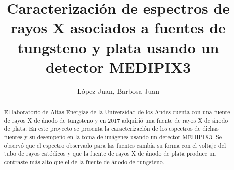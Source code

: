 \documentclass{sciposter}
\title{Caracterización de espectros de rayos X asociados a fuentes de tungsteno y plata usando un detector MEDIPIX3}
\author{López Juan, Barbosa Juan}
\institute 
{Departamento de Física\\
Universidad de los Andes\\
Cra 1 N$^\circ$ 18A - 12 Bogotá, Colombia}
\begin{document}
\maketitle

\begin{multicols}{3}

\begin{abstract}
	El laboratorio de Altas Energías de la Universidad de los Andes cuenta con una fuente de rayos X de ánodo de tungsteno y en 2017 adquirió una fuente de rayos X de ánodo de plata. En este proyecto se presenta la caracterización de los espectros de dichas fuentes y su desempeño en la toma de imágenes usando un detector MEDIPIX3. Se observó que el espectro observado para las fuentes cambia su forma con el voltaje del tubo de rayos catódicos y que la fuente de rayos X de ánodo de plata produce un contraste más alto que el de la fuente de ánodo de tungsteno.
\end{abstract}


\end{multicols}
\end{document}
